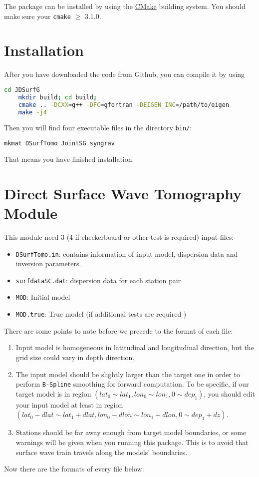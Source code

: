 \documentclass[UTF8]{article}
\begin{document}
The package can be installed by using the \href{https://cmake.org/}{CMake} building system. You should make sure your \texttt{cmake} $\geq$ 3.1.0.

\section{Installation}
After you have downloaded the code from Github,
you can compile it by using
\begin{lstlisting}[language=bash]
    cd JDSurfG
    mkdir build; cd build;
    cmake .. -DCXX=g++ -DFC=gfortran -DEIGEN_INC=/path/to/eigen
    make -j4
\end{lstlisting}
Then you will find four executable files in the 
directory \texttt{bin/}:
\begin{lstlisting}[language=bash]
    mkmat DSurfTomo JointSG syngrav  
\end{lstlisting}
That means you have finished installation. \\

\section{Direct Surface Wave Tomography Module} 
This module need 3 (4 if checkerboard or other test 
is required) input files:
\begin{itemize}
\item \verb!DSurfTomo.in!: contains information of 
        input model, dispersion data and inversion 
        parameters.
\item \verb!surfdataSC.dat!: dispersion data for 
            each station pair
\item \verb!MOD!: Initial model
\item \verb!MOD.true!: True model (if 
                        additional tests are required )
\end{itemize}
There are some points to note before we precede to the 
format of each file:
\begin{enumerate}[(1)]
    \item Input model is homogeneous in latitudinal and 
            longitudinal direction, but the grid size 
            could vary in depth direction.
    \item The input model should be slightly larger than
          the target one in order to perform \texttt{B-Spline}
          smoothing for forward computation. To be specific,
         if our target model is in region 
         $(lat_0 \sim lat_1,lon_0\sim lon_1,0\sim dep_1)$, 
        you should edit your input model at least in 
        region $(lat_0-dlat \sim lat_1+dlat, lon_0-dlon \sim lon_1+dlon,0 \sim dep_1+dz)$.
    \item Stations should be far away enough from target model 
            boundaries, or some warnings will be given 
            when you running this package. This is to 
            avoid that surface wave train travels along
            the models' boundaries.
\end{enumerate}
Now there are the formats of every file below:
\end{document}
